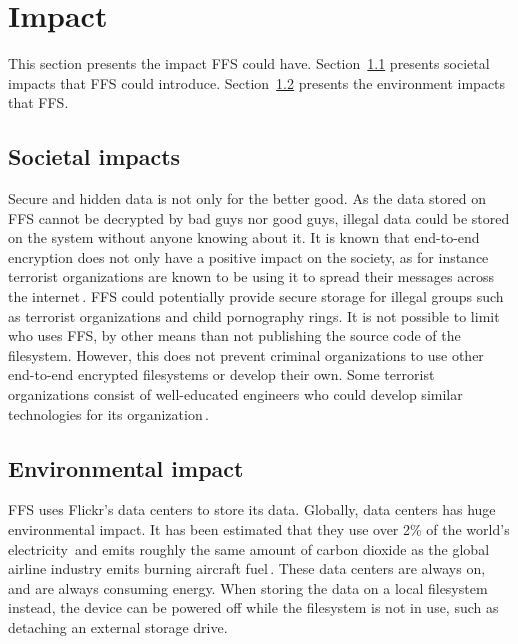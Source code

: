 \section{Impact}
This section presents the impact FFS could have. Section~\ref{subsec:imp_soc} presents societal impacts that FFS could introduce. Section~\ref{subsec:imp_env} presents the environment impacts that FFS.

\subsection{Societal impacts}
\label{subsec:imp_soc}
Secure and hidden data is not only for the better good. As the data stored on FFS cannot be decrypted by bad guys nor good guys, illegal data could be stored on the system without anyone knowing about it. It is known that end-to-end encryption does not only have a positive impact on the society, as for instance terrorist organizations are known to be using it to spread their messages across the internet\,\cite{ruddEncryptionCounterterrorismGetting2017}. FFS could potentially provide secure storage for illegal groups such as terrorist organizations and child pornography rings. It is not possible to limit who uses FFS, by other means than not publishing the source code of the filesystem. However, this does not prevent criminal organizations to use other end-to-end encrypted filesystems or develop their own. Some terrorist organizations consist of well-educated engineers who could develop similar technologies for its organization\,\cite{berrebyEngineeringTerror2010}.

\subsection{Environmental impact}
\label{subsec:imp_env}
FFS uses Flickr's data centers to store its data. Globally, data centers has huge environmental impact. It has been estimated that they use over 2\% of the world's electricity\,\cite{mcleanDataCentersGenerate2020} and emits roughly the same amount of carbon dioxide as the global airline industry emits burning aircraft fuel\,\cite{pearceEnergyHogsCan}. These data centers are always on, and are always consuming energy. When storing the data on a local filesystem instead, the device can be powered off while the filesystem is not in use, such as detaching an external storage drive.

